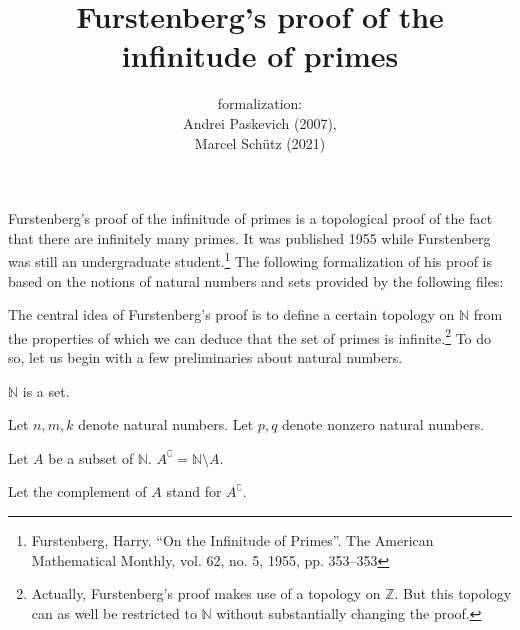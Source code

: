 \documentclass{article}
\title{Furstenberg's proof of the infinitude of primes}
\author{\Naproche formalization: \vspace{0.5em} \\
Andrei Paskevich (2007), \\
Marcel Schütz (2021)}
\date{}
\begin{document}
  \maketitle

  Furstenberg's proof of the infinitude of primes is a topological proof of the
  fact that there are infinitely many primes.
  It was published 1955 while Furstenberg was still an undergraduate
  student.\footnote{Furstenberg, Harry. \enquote{On the Infinitude of Primes}.
  The American Mathematical Monthly, vol. 62, no. 5, 1955, pp. 353–353}
  The following formalization of his proof is based on the notions of natural
  numbers and sets provided by the following files:

  \begin{forthel}
  \end{forthel}

  \begin{forthel}
  \end{forthel}

  \begin{forthel}
  \end{forthel}

  The central idea of Furstenberg's proof is to define a certain topology on
  $\mathbb{N}$ from the properties of which we can deduce that the set of
  primes is infinite.\footnote{Actually, Furstenberg's proof makes use of a
  topology on $\mathbb{Z}$. But this topology can as well be restricted to
  $\mathbb{N}$ without substantially changing the proof.}
  To do so, let us begin with a few preliminaries about natural numbers.

  \begin{forthel}
    \begin{axiom}
      $\mathbb{N}$ is a set.
    \end{axiom}

    Let $n,m,k$ denote natural numbers.
    Let $p,q$ denote nonzero natural numbers.

    \begin{definition}
      Let $A$ be a subset of $\mathbb{N}$.
      $A^{\complement} = \mathbb{N} \setminus A$.
    \end{definition}

    Let the complement of $A$ stand for $A^{\complement}$.
  \end{forthel}
\end{document}
